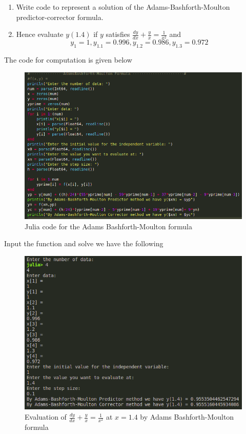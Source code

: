 \documentclass[a4paper,12pt,openany]{book}
\begin{document}
\begin{problem}
	\begin{enumerate}
		\item Write code to represent a solution of the Adams-Bashforth-Moulton predictor-corrector formula.
		\item Hence evaluate $y(1.4)$ if $y$ satisfies $\frac{dy}{dx} + \frac{y}{x} = \frac{1}{x^2}$ and $$y_{1} = 1, y_{1.1} = 0.996, y_{1.2} = 0.986, y_{1.3} = 0.972$$
	\end{enumerate}
\end{problem}

\begin{soln}
	The code for computation is given below
	\begin{figure}[H]
		\centering
		\includegraphics[width = .7\linewidth]{pic7}
		\caption{Julia code for the Adams Bashforth-Moulton formula}
	\end{figure}
Input the function and solve we have the following
\begin{figure}[H]
	\centering
	\includegraphics[width = .7\linewidth]{pic8}
	\caption{Evaluation of $\frac{dy}{dx} + \frac{y}{x} = \frac{1}{x^2}$ at $x = 1.4$ by Adams Bashforth-Moulton formula}
\end{figure}
\end{soln}
\end{document}
